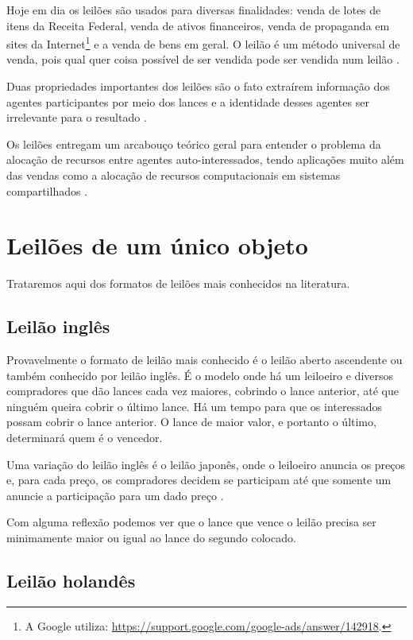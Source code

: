Hoje em dia os leilões são usados para diversas finalidades: venda de lotes de itens da Receita Federal, venda de ativos financeiros, venda de propaganda em sites da Internet\footnote{A Google utiliza: \url{https://support.google.com/google-ads/answer/142918}.} e a venda de bens em geral. O leilão é um método universal de venda, pois qual quer coisa possível de ser vendida pode ser vendida num leilão \citet{krishna}.

Duas propriedades importantes dos leilões são o fato extraírem informação dos agentes participantes por meio dos lances e a identidade desses agentes ser irrelevante para o resultado \citet{krishna}.

Os leilões entregam um arcabouço teórico geral para entender o problema da alocação de recursos entre agentes auto-interessados, tendo aplicações muito além das vendas como a alocação de recursos computacionais em sistemas compartilhados \citet{Shoham2008}.

\section{Leilões de um único objeto}

Trataremos aqui dos formatos de leilões mais conhecidos na literatura.

\subsection{Leilão inglês}

Provavelmente o formato de leilão mais conhecido é o leilão aberto ascendente ou também conhecido por leilão inglês. É o modelo onde há um leiloeiro e diversos compradores que dão lances cada vez maiores, cobrindo o lance anterior, até que ninguém queira cobrir o último lance. Há um tempo para que os interessados possam cobrir o lance anterior. O lance de maior valor, e portanto o último, determinará quem é o vencedor.

Uma variação do leilão inglês é o leilão japonês, onde o leiloeiro anuncia os preços e, para cada preço, os compradores decidem se participam até que somente um anuncie a participação para um dado preço \citet{Shoham2008}.

Com alguma reflexão podemos ver que o lance que vence o leilão precisa ser minimamente maior ou igual ao lance do segundo colocado.

\subsection{Leilão holandês}

